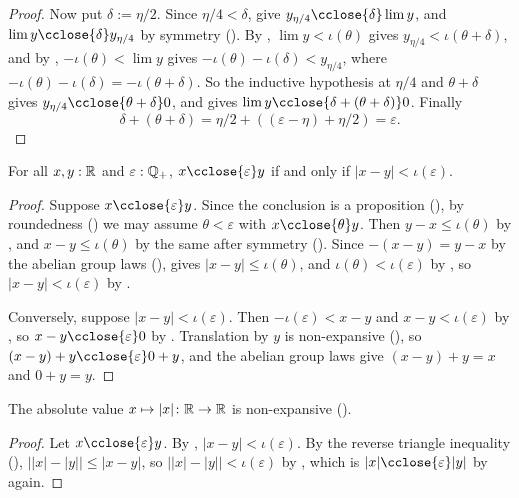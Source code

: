 \begin{proof}
  Now put $\delta := \eta/2$. Since $\eta/4 < \delta$,  give $y_{\eta/4} \cclose{\delta} \lim y$, and $\lim y \cclose{\delta} y_{\eta/4}$ by symmetry (). By , $\lim y < \iota(\theta)$ gives $y_{\eta/4} < \iota(\theta + \delta)$, and by , $-\iota(\theta) < \lim y$ gives $-\iota(\theta) - \iota(\delta) < y_{\eta/4}$, where $-\iota(\theta) - \iota(\delta) = -\iota(\theta + \delta)$. So the inductive hypothesis at $\eta/4$ and $\theta + \delta$ gives $y_{\eta/4} \cclose{\theta + \delta} 0$, and  gives $\lim y \cclose{\delta + (\theta + \delta)} 0$. Finally
  \[
    \delta + (\theta + \delta) = \eta/2 + ((\varepsilon - \eta) + \eta/2) = \varepsilon.
  \]
\end{proof}

\begin{theorem}
  \label{closeIffAbsLtReal}
  For all $x, y : \mathbb{R}$ and $\varepsilon : \mathbb{Q}_{+}$, $x \cclose{\varepsilon} y$ if and only if $\lvert x - y \rvert < \iota(\varepsilon)$.
\end{theorem}
\begin{proof}
  Suppose $x \cclose{\varepsilon} y$. Since the conclusion is a proposition (), by roundedness () we may assume $\theta < \varepsilon$ with $x \cclose{\theta} y$. Then $y - x \le \iota(\theta)$ by , and $x - y \le \iota(\theta)$ by the same after symmetry (). Since $-(x - y) = y - x$ by the abelian group laws (),  gives $\lvert x - y \rvert \le \iota(\theta)$, and $\iota(\theta) < \iota(\varepsilon)$ by , so $\lvert x - y \rvert < \iota(\varepsilon)$ by .

  Conversely, suppose $\lvert x - y \rvert < \iota(\varepsilon)$. Then $-\iota(\varepsilon) < x - y$ and $x - y < \iota(\varepsilon)$ by , so $x - y \cclose{\varepsilon} 0$ by . Translation by $y$ is non-expansive (), so $(x - y) + y \cclose{\varepsilon} 0 + y$, and the abelian group laws give $(x - y) + y = x$ and $0 + y = y$.
\end{proof}

\begin{lemma}
  \label{absNReal}
  The absolute value $x \mapsto \lvert x \rvert \colon \mathbb{R} \to \mathbb{R}$ is non-expansive ().
\end{lemma}
\begin{proof}
  Let $x \cclose{\varepsilon} y$. By , $\lvert x - y \rvert < \iota(\varepsilon)$. By the reverse triangle inequality (), $\lvert \lvert x \rvert - \lvert y \rvert \rvert \le \lvert x - y \rvert$, so $\lvert \lvert x \rvert - \lvert y \rvert \rvert < \iota(\varepsilon)$ by , which is $\lvert x \rvert \cclose{\varepsilon} \lvert y \rvert$ by  again.
\end{proof}

